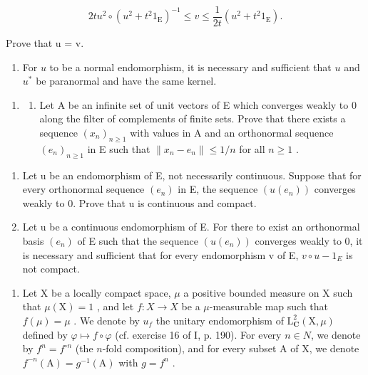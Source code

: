 \[
2 t u ^ {2} \circ (u ^ {2} + t ^ {2} 1 _ {\mathrm{E}}) ^ {- 1} \leqslant v \leqslant \frac {1}{2 t} (u ^ {2} + t ^ {2} 1 _ {\mathrm{E}}).
\]

Prove that u = v.

\begin{enumerate}
\def\labelenumi{\alph{enumi})}
\setcounter{enumi}{1}
\tightlist
\item
  For \(u\) to be a normal endomorphism, it is necessary and sufficient that \(u\) and \(u^*\) be paranormal and have the same kernel.
\end{enumerate}

\begin{enumerate}
\def\labelenumi{\arabic{enumi})}
\setcounter{enumi}{12}
\tightlist
\item
  \begin{enumerate}
  \def\labelenumii{\alph{enumii})}
  \tightlist
  \item
    Let A be an infinite set of unit vectors of E which converges weakly to 0 along the filter of complements of finite sets. Prove that there exists a sequence \((x_{n})_{n\geqslant 1}\) with values in A and an orthonormal sequence \((e_n)_{n\geqslant 1}\) in E such that \(\| x_n - e_n\| \leqslant 1 / n\) for all \(n\geqslant 1\) .
  \end{enumerate}
\end{enumerate}

\begin{enumerate}
\def\labelenumi{\alph{enumi})}
\setcounter{enumi}{1}
\item
  Let u be an endomorphism of E, not necessarily continuous. Suppose that for every orthonormal sequence \((e_{n})\) in E, the sequence \((u(e_{n}))\) converges weakly to 0. Prove that u is continuous and compact.
\item
  Let u be a continuous endomorphism of E. For there to exist an orthonormal basis \((e_{n})\) of E such that the sequence \((u(e_{n}))\) converges weakly to 0, it is necessary and sufficient that for every endomorphism v of E, \(v \circ u - 1_{E}\) is not compact.
\end{enumerate}

\begin{enumerate}
\def\labelenumi{\arabic{enumi})}
\setcounter{enumi}{13}
\tightlist
\item
  Let X be a locally compact space, \(\mu\) a positive bounded measure on X such that \(\mu(\mathrm{X}) = 1\) , and let \(f: X \to X\) be a \(\mu\)-measurable map such that \(f(\mu) = \mu\) . We denote by \(u_{f}\) the unitary endomorphism of \(\mathrm{L}_{\mathbf{C}}^{2}(\mathrm{X}, \mu)\) defined by \(\varphi \mapsto f \circ \varphi\) (cf. exercise 16 of I, p. 190). For every \(n \in N\), we denote by \(f^{n} = f^{\circ n}\) (the \(n\)-fold composition), and for every subset A of X, we denote \(f^{-n}(\mathrm{A}) = g^{-1}(\mathrm{A})\) with \(g = f^{n}\) .
\end{enumerate}


